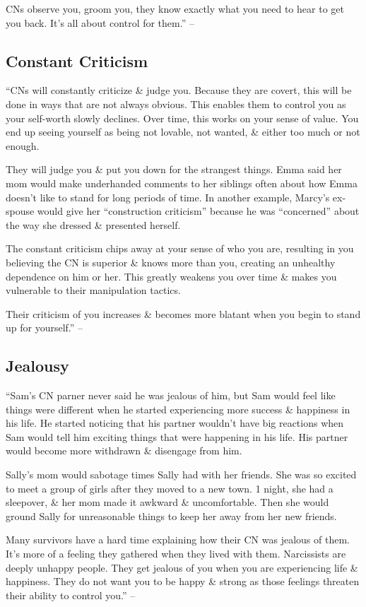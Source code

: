 \documentclass{article}
\numberwithin{equation}{section}
\begin{document}
CNs observe you, groom you, they know exactly what you need to hear to get you back. It's all about control for them.'' -- \cite[p. 54]{Mirza2017}

\subsection{Constant Criticism}
``CNs will constantly criticize \& judge you. Because they are covert, this will be done in ways that are not always obvious. This enables them to control you as your self-worth slowly declines. Over time, this works on your sense of value. You end up seeing yourself as being not lovable, not wanted, \& either too much or not enough.

They will judge you \& put you down for the strangest things. Emma said her mom would make underhanded comments to her siblings often about how Emma doesn't like to stand for long periods of time. In another example, Marcy's ex-spouse would give her ``construction criticism'' because he was ``concerned'' about the way she dressed \& presented herself.

The constant criticism chips away at your sense of who you are, resulting in you believing the CN is superior \& knows more than you, creating an unhealthy dependence on him or her. This greatly weakens you over time \& makes you vulnerable to their manipulation tactics.

Their criticism of you increases \& becomes more blatant when you begin to stand up for yourself.'' -- \cite[pp. 54--55]{Mirza2017}

\subsection{Jealousy}
``Sam's CN parner never said he was jealous of him, but Sam would feel like things were different when he started experiencing more success \& happiness in his life. He started noticing that his partner wouldn't have big reactions when Sam would tell him exciting things that were happening in his life. His partner would become more withdrawn \& disengage from him.

Sally's mom would sabotage times Sally had with her friends. She was so excited to meet a group of girls after they moved to a new town. 1 night, she had a sleepover, \& her mom made it awkward \& uncomfortable. Then she would ground Sally for unreasonable things to keep her away from her new friends.

Many survivors have a hard time explaining how their CN was jealous of them. It's more of a feeling they gathered when they lived with them. Narcissists are deeply unhappy people. They get jealous of you when you are experiencing life \& happiness. They do not want you to be happy \& strong as those feelings threaten their ability to control you.'' -- \cite[p. 55]{Mirza2017}
\end{document}
